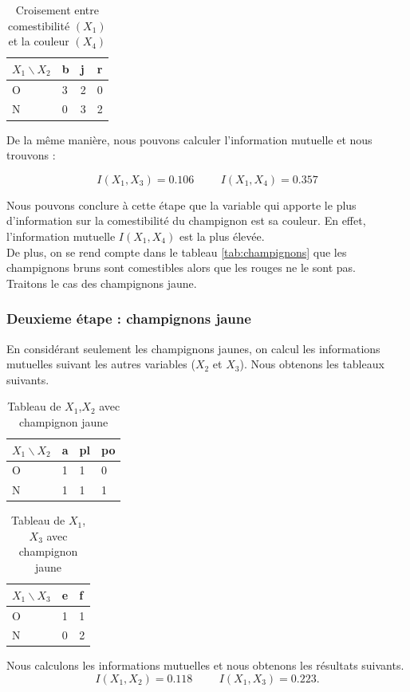 \documentclass{article}
\begin{document}
\begin{table}[H]
  \centering
    \caption{Croisement entre comestibilité $(X_1)$ et la couleur $(X_4)$}
    \begin{tabular}{|l|l|l|l|}
      \hline
      $X_1\backslash X_2$ & b & j & r \\ \hline
      O                    & 3  & 2 & 0  \\ \hline
      N                    & 0  & 3 & 2  \\ \hline
      \end{tabular}
\end{table}

De la même manière, nous pouvons calculer l'information mutuelle et nous trouvons :




\[
  I(X_1,X_3)=0.106 \hspace{1cm} I(X_1,X_4)=0.357
\]




Nous pouvons conclure à cette étape que la variable qui apporte le plus d'information sur la comestibilité du champignon est sa couleur. En effet, l'information mutuelle $I(X_1,X_4)$ est la plus élevée.
\\
De plus, on se rend compte dans le tableau \ref{tab:champignons} que les champignons bruns sont comestibles alors que les rouges ne le sont pas.
\\
Traitons le cas des champignons jaune.
    
\subsubsection{Deuxieme étape : champignons jaune}
En considérant seulement les champignons jaunes, on calcul les informations mutuelles suivant les autres variables ($X_2$ et $X_3$). Nous obtenons les tableaux suivants.

\begin{table}[H]
  \caption{Tableau de $X_1$,$X_2$ avec champignon jaune}
  \centering
  \begin{tabular}{|l|l|l|l|}
  \hline
  $X_1\backslash X_2$ & a & pl & po \\ \hline
  O                    & 1 & 1  & 0  \\ \hline
  N                    & 1 & 1  & 1  \\ \hline
  \end{tabular}
  \end{table}

\begin{table}[H]
  \centering
  \caption{Tableau de $X_1$,$X_3$ avec champignon jaune}
  \begin{tabular}{|l|l|l|}
  \hline
  $X_1\backslash X_3$ & e & f \\ \hline
  O                    & 1 & 1 \\ \hline
  N                    & 0 & 2 \\ \hline
  \end{tabular}
  \end{table}
Nous calculons les informations mutuelles et nous obtenons les résultats suivants.
\[
  I(X_1,X_2)=0.118 \hspace{1cm} I(X_1,X_3)=0.223.
\]
\end{document}

